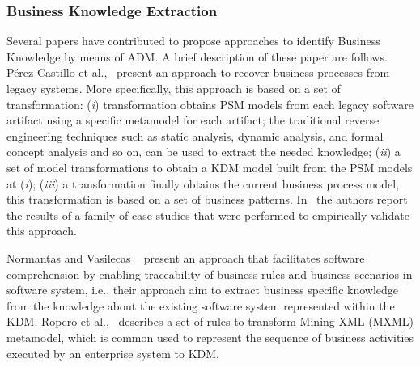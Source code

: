 \subsubsection{Business Knowledge Extraction}
\label{ssub:Business_Knowledge_Extraction}

Several papers have contributed to propose approaches to identify Business Knowledge by means of ADM. A brief description of these paper are follows. P\'{e}rez-Castillo et al.,~\cite{Perez-Castillo:2011:ECS:1982185.1982249,6080834, 6498507,Perez-Castillo:2010:IBP:1875847.1875861} present an approach to recover business processes from legacy systems. More specifically, this approach is based on a set of transformation: (\textit{i}) transformation obtains PSM models from each legacy software artifact using a specific metamodel for each artifact; the traditional reverse engineering techniques such as static analysis, dynamic analysis, and formal concept analysis and so on, can be used to extract the needed knowledge; (\textit{ii}) a set of model transformations to obtain a KDM model built from the PSM models at (\textit{i}); (\textit{iii}) a transformation finally obtains the current business process model, this transformation is based on a set of business patterns. In~\cite{PerezCastillo20121370} the authors report the results of a family of case studies that were performed to empirically validate this approach. %

Normantas and Vasilecas ~\cite{lastDAyOFMyLife} present an approach that facilitates software comprehension by enabling traceability of business rules and business scenarios in software system, i.e., their approach aim to extract business specific knowledge from the knowledge about the existing software system represented within the KDM. Ropero et al.,~\cite{Fernandez-Ropero:2012:EAB:2367051.2367064} describes a set of rules to transform Mining XML (MXML) metamodel, which is common used to represent the sequence of business activities executed by an enterprise system to KDM. %


